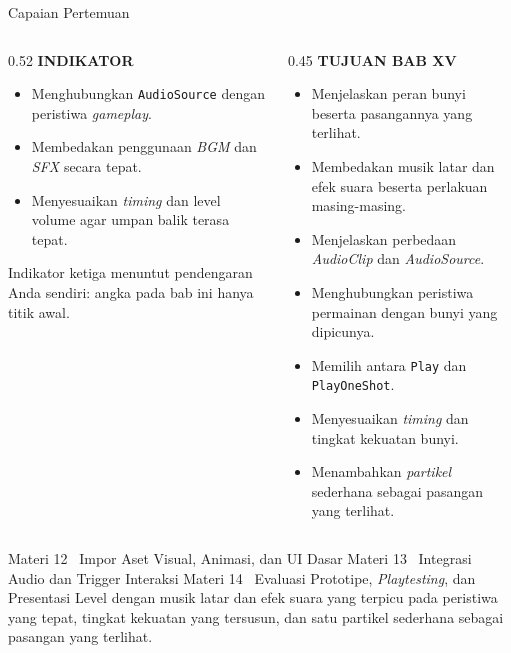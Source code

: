 \documentclass[aspectratio=169,10pt]{beamer}
\begin{document}
\begin{frame}{Capaian Pertemuan}
\begin{columns}[T,onlytextwidth]
\begin{column}{0.52\textwidth}
    {\fontsize{7}{8.5}\selectfont\bfseries\color{ubAccent}INDIKATOR}\par
    \vspace{0.06cm}
    \begin{itemize}
      \item Menghubungkan \texttt{AudioSource} dengan peristiwa
            \emph{gameplay}.
      \item Membedakan penggunaan \emph{BGM} dan \emph{SFX} secara tepat.
      \item Menyesuaikan \emph{timing} dan level volume agar umpan balik
            terasa tepat.
    \end{itemize}
    \vspace{0.08cm}
    \begin{kotak}
      Indikator ketiga menuntut pendengaran Anda sendiri: angka pada bab ini
      hanya titik awal.
    \end{kotak}
  \end{column}
  \begin{column}{0.45\textwidth}
    {\fontsize{7}{8.5}\selectfont\bfseries\color{ubAccent}TUJUAN BAB XV}\par
    \vspace{0.08cm}
    \begin{itemize}
      \item Menjelaskan peran bunyi beserta pasangannya yang terlihat.
      \item Membedakan musik latar dan efek suara beserta perlakuan masing-masing.
      \item Menjelaskan perbedaan \emph{AudioClip} dan \emph{AudioSource}.
      \item Menghubungkan peristiwa permainan dengan bunyi yang dipicunya.
      \item Memilih antara \texttt{Play} dan \texttt{PlayOneShot}.
      \item Menyesuaikan \emph{timing} dan tingkat kekuatan bunyi.
      \item Menambahkan \emph{partikel} sederhana sebagai pasangan yang
            terlihat.
    \end{itemize}
  \end{column}
\end{columns}
\end{frame}

  {Materi 12 \textperiodcentered\ Impor Aset Visual, Animasi, dan UI Dasar}
  {Materi 13 \textperiodcentered\ Integrasi Audio dan Trigger Interaksi}
  {Materi 14 \textperiodcentered\ Evaluasi Prototipe, \emph{Playtesting}, dan
   Presentasi}
  {Level dengan musik latar dan efek suara yang terpicu pada peristiwa yang
   tepat, tingkat kekuatan yang tersusun, dan satu partikel sederhana sebagai
   pasangan yang terlihat.}
\end{document}
